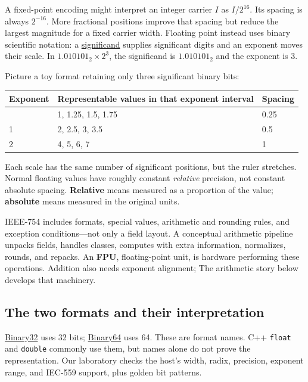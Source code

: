 A fixed-point encoding might interpret an integer carrier \(I\) as \(I/2^{16}\). Its spacing is always \(2^{-16}\). More fractional positions improve that spacing but reduce the largest magnitude for a fixed carrier width. Floating point instead uses binary scientific notation: a \hyperref[appendix-a24fd710cf67]{significand} supplies significant digits and an exponent moves their scale. In \(1.010101_2\times2^3\), the significand is \(1.010101_2\) and the exponent is 3.

Picture a toy format retaining only three significant binary bits:

{\def\LTcaptype{none} %
\begin{longtable}[]{@{}lll@{}}
\toprule\noalign{}
Exponent & Representable values in that exponent interval & Spacing \\
\midrule\noalign{}
\endhead
\bottomrule\noalign{}
\endlastfoot
0 & 1, 1.25, 1.5, 1.75 & 0.25 \\
1 & 2, 2.5, 3, 3.5 & 0.5 \\
2 & 4, 5, 6, 7 & 1 \\
\end{longtable}
}

Each scale has the same number of significant positions, but the ruler stretches. Normal floating values have roughly constant \emph{relative} precision, not constant absolute spacing. \textbf{Relative} means measured as a proportion of the value; \textbf{absolute} means measured in the original units.

IEEE-754 includes formats, special values, arithmetic and rounding rules, and exception conditions---not only a field layout. A conceptual arithmetic pipeline unpacks fields, handles classes, computes with extra information, normalizes, rounds, and repacks. An \textbf{FPU}, floating-point unit, is hardware performing these operations. Addition also needs exponent alignment; The arithmetic story below develops that machinery.

\subsection{The two formats and their interpretation}\label{01-foundations-i-ch001-the-two-formats-and-their-interpretation}

\hyperref[appendix-5057f9ad327f]{Binary32} uses 32 bits; \hyperref[appendix-5078dfab64e6]{Binary64} uses 64. These are format names. C++ \texttt{float} and \texttt{double} commonly use them, but names alone do not prove the representation. Our laboratory checks the host's width, radix, precision, exponent range, and IEC-559 support, plus golden bit patterns.

